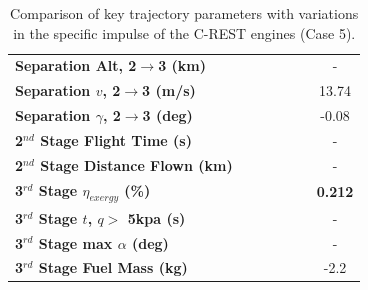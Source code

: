 \begin{table}[ht!]
\begin{tabular}{l c c c c c c}
		\textbf{Separation Alt, 2$\rightarrow$3 (km)}
		& \secondthirdSeparationAltIspNinetyNoReturn
		& \secondthirdSeparationAltIspNinetyFiveNoReturn
		& \secondthirdSeparationAltIspStandardNoReturn
		& \secondthirdSeparationAltIspOneHundredFiveNoReturn
		& \secondthirdSeparationAltIspOneHundredTenNoReturn
		& -
		\\
		\textbf{Separation $v$, 2$\rightarrow$3 (m/s)}
		& \secondthirdSeparationvIspNinetyNoReturn
		& \secondthirdSeparationvIspNinetyFiveNoReturn
		& \secondthirdSeparationvIspStandardNoReturn
		& \secondthirdSeparationvIspOneHundredFiveNoReturn
		& \secondthirdSeparationvIspOneHundredTenNoReturn
		&13.74
		\\
		\textbf{Separation $\gamma$, 2$\rightarrow$3 (deg)}
		& \secondthirdSeparationgammaIspNinetyNoReturn
		& \secondthirdSeparationgammaIspNinetyFiveNoReturn
		& \secondthirdSeparationgammaIspStandardNoReturn
		& \secondthirdSeparationgammaIspOneHundredFiveNoReturn
		& \secondthirdSeparationgammaIspOneHundredTenNoReturn
		&-0.08
		\\
		\textbf{2$^{nd}$ Stage Flight Time (s)}
		& \secondFlightTimeIspNinetyNoReturn
		& \secondFlightTimeIspNinetyFiveNoReturn
		& \secondFlightTimeIspStandardNoReturn
		& \secondFlightTimeIspOneHundredFiveNoReturn
		& \secondFlightTimeIspOneHundredTenNoReturn
		& -
		\\
		\textbf{2$^{nd}$ Stage Distance Flown (km)}
		& \SecondDistIspNinetyNoReturn
		& \SecondDistIspNinetyFiveNoReturn
		& \SecondDistIspStandardNoReturn
		& \SecondDistIspOneHundredFiveNoReturn
		& \SecondDistIspOneHundredTenNoReturn
		& -
		\\
		\hline 
		\textbf{3$^{rd}$ Stage $\eta_{exergy}$ (\%)}
		& \textbf{\thirddExergyEffIspNinetyNoReturn}
		& \textbf{\thirddExergyEffIspNinetyFiveNoReturn}
		& \textbf{\thirddExergyEffIspStandardNoReturn}
		& \textbf{\thirddExergyEffIspOneHundredFiveNoReturn}
		& \textbf{\thirddExergyEffIspOneHundredTenNoReturn}
		& \textbf{0.212}
		\\

		\textbf{3$^{rd}$ Stage $t$, $q >$ 5kpa (s)}
		& \thirdqOverFiveIspNinetyNoReturn
		& \thirdqOverFiveIspNinetyFiveNoReturn
		& \thirdqOverFiveIspStandardNoReturn
		& \thirdqOverFiveIspOneHundredFiveNoReturn
		& \thirdqOverFiveIspOneHundredTenNoReturn
		& -
		\\
		\textbf{3$^{rd}$ Stage max $\alpha$ (deg)}
		& \thirdmaxAoAIspNinetyNoReturn
		& \thirdmaxAoAIspNinetyFiveNoReturn
		& \thirdmaxAoAIspStandardNoReturn
		& \thirdmaxAoAIspOneHundredFiveNoReturn
		& \thirdmaxAoAIspOneHundredTenNoReturn
		& -
		\\
		\textbf{3$^{rd}$ Stage Fuel Mass (kg)}
		& \thirdmFuelIspNinetyNoReturn
		& \thirdmFuelIspNinetyFiveNoReturn
		& \thirdmFuelIspStandardNoReturn
		& \thirdmFuelIspOneHundredFiveNoReturn
		& \thirdmFuelIspOneHundredTenNoReturn
		&-2.2
		\\
		\hline 
	\end{tabular} 
	
	\caption{Comparison of key trajectory parameters with variations in the specific impulse of the C-REST engines (Case 5).}
	\label{tab:comparison30}
\end{table}

